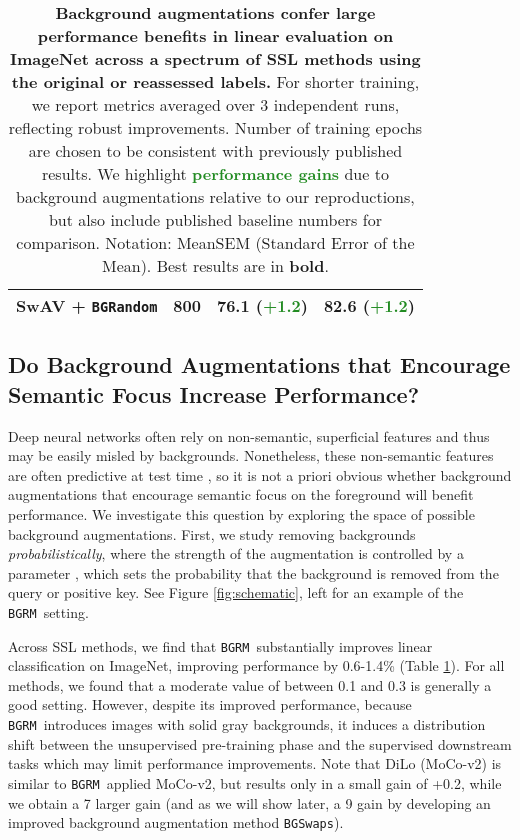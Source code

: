 \documentclass[twoside,11pt]{article}
\newcommand{\bgrm}{\texttt{BG\textunderscore RM}}
\newcommand{\bgswaps}{\texttt{BG\textunderscore Swaps}}
\newcommand{\bgrand}{\texttt{BG\textunderscore Random}}
\newcommand{\moco}{MoCo-v2}
\begin{document}
\begin{table}
{\begin{tabular}{lccc}
    \rowcolor{lightgray}
    SwAV + \bgrand & 800 & \textbf{76.1} (\textbf{\textcolor{ForestGreen}{+1.2}}) & \textbf{82.6} (\textbf{\textcolor{ForestGreen}{+1.2}}) \\\bottomrule
    \end{tabular}
    }
    \caption{
   \textbf{Background augmentations confer large performance benefits in linear evaluation on \textbf{ImageNet} across a spectrum of SSL methods using the original or reassessed labels.} For shorter training, we report metrics averaged over 3 independent runs, reflecting robust improvements. Number of training epochs are chosen to be consistent with previously published results. We highlight \textbf{\textcolor{ForestGreen}{performance gains}} due to background augmentations relative to our reproductions, but also include published baseline numbers for comparison. Notation: MeanSEM (Standard Error of the Mean). Best results are in \textbf{bold}.
    }
    \label{tab:gain_summary_imgnet_deepusps}
\end{table}




\subsection{Do Background Augmentations that Encourage Semantic Focus Increase Performance?}

Deep neural networks often rely on non-semantic, superficial features and thus may be easily misled by backgrounds. Nonetheless, these non-semantic features are often predictive at test time \citep{xiao2020noise, sehwag2020time, ilyas_neurips_2020_features_not_bugs}, so it is not a priori obvious whether background augmentations that encourage semantic focus on the foreground will benefit performance. We investigate this question by exploring the space of possible background augmentations. First, we study removing backgrounds {\em probabilistically}, where the strength of the augmentation is controlled by a parameter , which sets the probability that the background is removed from the query or positive key. See Figure \ref{fig:schematic}, left for an example of the \bgrm~setting.

Across SSL methods, we find that \bgrm~substantially improves linear classification on ImageNet, improving performance by 0.6-1.4\% (Table \ref{tab:gain_summary_imgnet_deepusps}). For all methods, we found that a moderate value of  between 0.1 and 0.3 is generally a good setting. However, despite its improved performance, because \bgrm~introduces images with solid gray backgrounds, it induces a distribution shift between the unsupervised pre-training phase and the supervised downstream tasks which may limit performance improvements. Note that DiLo (\moco) is similar to \bgrm~applied \moco, but results only in a small gain of +0.2, while we obtain a 7 larger gain (and as we will show later, a 9 gain by developing an improved background augmentation method \bgswaps).
\end{document}
